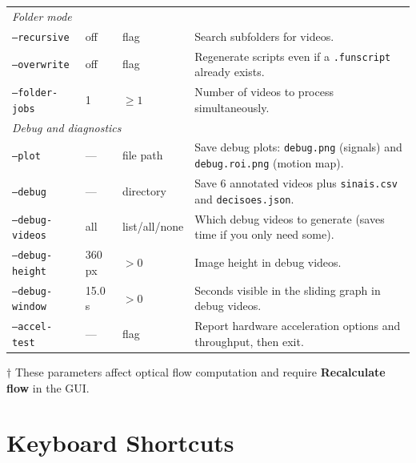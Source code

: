 \documentclass[11pt,a4paper]{article}
\newcommand{\code}[1]{\texttt{#1}}
\begin{document}
\begin{longtable}{p{3.2cm} p{2.2cm} p{1.5cm} p{7.5cm}}
  \multicolumn{4}{l}{\textit{Folder mode}} \\
  \code{--recursive}     & off       & flag       & Search subfolders for videos. \\
  \code{--overwrite}     & off       & flag       & Regenerate scripts even if a \code{.funscript} already exists. \\
  \code{--folder-jobs}   & 1         & $\ge 1$    & Number of videos to process simultaneously. \\

  \multicolumn{4}{l}{\textit{Debug and diagnostics}} \\
  \code{--plot}          & ---       & file path  & Save debug plots: \code{debug.png} (signals) and \code{debug.roi.png} (motion map). \\
  \code{--debug}         & ---       & directory  & Save 6 annotated videos plus \code{sinais.csv} and \code{decisoes.json}. \\
  \code{--debug-videos}  & all       & list/all/none & Which debug videos to generate (saves time if you only need some). \\
  \code{--debug-height}  & 360 px    & $>0$       & Image height in debug videos. \\
  \code{--debug-window}  & 15.0 s    & $>0$       & Seconds visible in the sliding graph in debug videos. \\
  \code{--accel-test}    & ---       & flag       & Report hardware acceleration options and throughput, then exit. \\

\end{longtable}
\endgroup

\vspace{1em}
\noindent\small $\dagger$ These parameters affect optical flow computation and require \textbf{Recalculate flow} in the GUI.

\section*{Keyboard Shortcuts}
\end{document}
